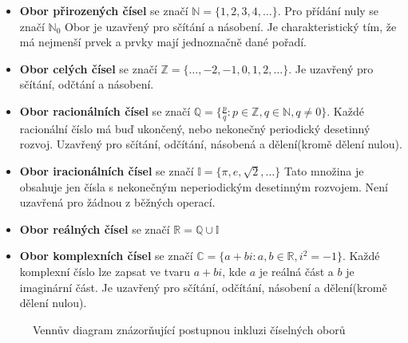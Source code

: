 \documentclass[12pt]{article}
\begin{document}
\begin{itemize} [itemsep = 2pt]
    \item \textbf{Obor přirozených čísel} se značí $\mathbb{N} = \{1, 2 ,3, 4, \dots\}$. Pro přídání nuly se značí $\mathbb{N}_0$ Obor je uzavřený pro sčítání a násobení. Je charakteristický tím, že má nejmenší prvek a prvky mají jednoznačně dané pořadí.
    \item \textbf{Obor celých čísel} se značí $\mathbb{Z} = \{ \dots, -2, -1, 0, 1, 2, \dots \}$. Je uzavřený pro sčítání, odčtání a násobení.
    \item \textbf{Obor racionálních čísel} se značí $\mathbb{Q} = \{ \frac{p}{q} : p \in \mathbb{Z}, q \in \mathbb{N}, q \neq 0 \}$. Každé racionální číslo má buď ukončený, nebo nekonečný periodický desetinný rozvoj. Uzavřený pro sčítání, odčítání, násobená a dělení(kromě dělení nulou).
    \item \textbf{Obor iracionálních čísel} se značí $\mathbb{I} = \{\pi, e, \sqrt{2}, \dots\}$ Tato množina je obsahuje jen čísla s nekonečným neperiodickým desetinným rozvojem. Není uzavřená pro žádnou z běžných operací.
    \item \textbf{Obor reálných čísel} se značí $\mathbb{R} = \mathbb{Q} \cup \mathbb{I}$
    \item \textbf{Obor komplexních čísel} se značí $\mathbb{C} = \{ a + bi : a, b \in \mathbb{R}, i^2 = -1 \}$. Každé komplexní číslo lze zapsat ve tvaru $a + bi$, kde $a$ je reálná část a $b$ je imaginární část. Je uzavřený pro sčítání, odčítání, násobení a dělení(kromě dělení nulou).
\end{itemize}

\begin{figure}[H]
    \centering
    \caption*{Vennův diagram znázorňující postupnou inkluzi číselných oborů}
\end{figure}
\end{document}
